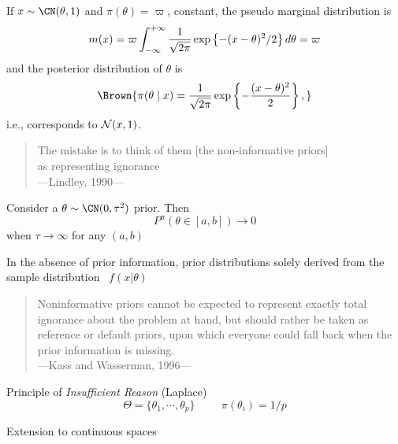 \begin{slide}
\end{slide}\begin{slide}
If $x\sim\CN(\theta,1)$ and $\pi(\theta)=\varpi$, constant, 
the pseudo marginal distribution is 
$$
  m(x) =  \varpi \int^{+\infty }_{-\infty} {1 \over \sqrt{ 2\pi} }  
     \exp \left\{-(x-\theta)^2 /2 \right\} d\theta = \varpi
$$
and the posterior distribution of $\theta$ is
$${\Brown{
  \pi (\theta \mid x) = {1 \over \sqrt{ 2\pi}} 
     \exp \left\{ - {(x-\theta )^ 2 \over 2} \right\}  ,
}}$$
i.e., corresponds to ${\cal N}(x,1)$.
\fin

\end{slide}\begin{slide}

\small\begin{flushright}\begin{quote}
The mistake is to think of them [the non-informative priors]\\
as representing ignorance\\
---Lindley, 1990---
\end{quote}\end{flushright}\normalsize

\pause
\debut Consider a $\theta\sim\CN(0,\tau^2)$ prior. Then
$$
  P^\pi\left( \theta \in [a,b] \right) \longrightarrow 0
$$
when ${\tau\to\infty}$ for any $(a,b)$
\fin

\end{slide}
\begin{slide}

\bigskip
\centerline{}

\pause
\bigskip
In the absence of prior information, prior distributions solely derived from the sample distribution \
$f(x|\theta)$

\pause\bigskip
\small\begin{flushright}\begin{quote}
Noninformative priors cannot be expected to represent exactly total ignorance
about the problem at hand, but should rather be taken as reference or 
default priors, upon which everyone could fall
back when the prior information is missing.\\
---Kass and Wasserman, 1996---
\end{quote}\end{flushright}\normalsize


\end{slide}\begin{slide}

Principle of {\it Insufficient Reason} (Laplace)
$$
\Theta = \{\theta_1,\cdots,\theta_p\}  \hspace{1cm}  \pi(\theta_i)=1/p
$$

\pause\smallskip
Extension to continuous spaces
{}

\end{slide}
